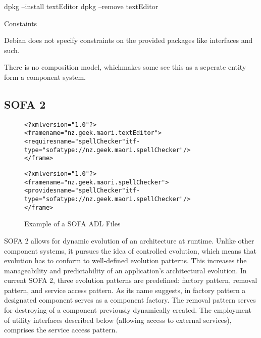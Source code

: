dpkg --install textEditor
dpkg --remove textEditor

Constaints 

Debian does not specify constraints on the provided packages like interfaces and such.

There is no composition model, whichmakes some see this as a seperate entity form a component system.

% 
% 
% 
% 
% 
% 

\subsection{SOFA 2}

\begin{figure}[htp]
\begin{center}
\begin{alltt}
<?xml version="1.0"?>
<frame name="nz.geek.maori.textEditor">
  <requires name="spellChecker" itf-type="sofatype://nz.geek.maori.spellChecker"/>
</frame>

<?xml version="1.0"?>
<frame name="nz.geek.maori.spellChecker">
  <provides name="spellChecker" itf-type="sofatype://nz.geek.maori.spellChecker"/>
</frame>
\end{alltt}
  \caption[SOFA ADL files]{Example of a SOFA ADL Files}
  \label{SOFAmetadata}
\end{center}
\end{figure}

SOFA 2 allows for dynamic evolution of an architecture at runtime. 
Unlike other component systems,
it pursues the idea of controlled evolution, which means that evolution has to conform to well-defined evolution patterns. 
This increases the manageability and predictability of an application's architectural evolution. 
In current SOFA 2, three evolution patterns are predefined: factory pattern, removal pattern, and service access pattern.
As its name suggests, in factory pattern a designated component serves as a component factory. 
The removal pattern serves for destroying of a component previously dynamically created.
The employment of utility interfaces described below (allowing access to external services), comprises the service access pattern.

